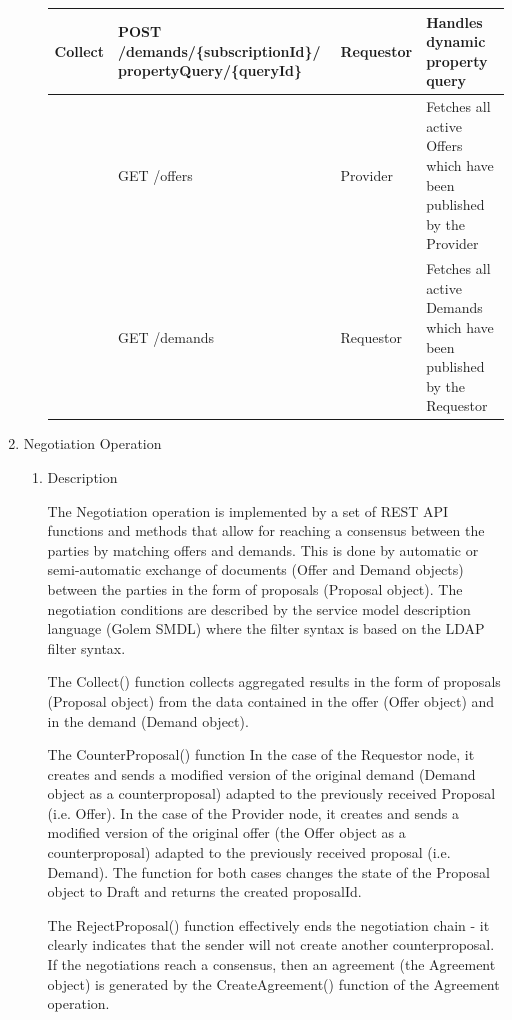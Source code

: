 \begin{enumerate}
\begin{enumerate}
\begin{table}[H]
\begin{center}
\begin{tabular}{|p{3cm}|p{7cm}|p{1.5cm}|p{4cm}|}
Collect				& 	POST /demands/\{subscriptionId\}/ \newline propertyQuery/\{queryId\} & Requestor & Handles dynamic property query \\
\hline 

					&	GET /offers								&	Provider	&	Fetches all active Offers which have been published by the Provider \\
\hline

					&	GET /demands							& 	Requestor	&	Fetches all active Demands which have been published by the Requestor \\
\hline	 

\end{tabular}
\end{center}
\end{table}

\end{enumerate}

\item  Negotiation Operation

\begin{enumerate}

\item Description

The Negotiation operation is implemented by a set of REST API functions and methods that allow for reaching a consensus between the parties
by matching offers and demands. This is done by automatic or semi-automatic exchange of documents (Offer and Demand objects)
between the parties in the form of proposals (Proposal object). 
The negotiation conditions are described by the service model description language (Golem SMDL) 
where the filter syntax is based on the LDAP filter syntax.

The Collect() function collects aggregated results in the form of proposals (Proposal object) from the data contained 
in the offer (Offer object) and in the demand (Demand object).

The CounterProposal() function In the case of the Requestor node, it creates and sends a modified version of the original demand 
(Demand object as a counterproposal) adapted to the previously received Proposal (i.e. Offer).
In the case of the Provider node, it creates and sends a modified version of the original offer (the Offer object as a counterproposal) 
adapted to the previously received proposal (i.e. Demand). The function for both cases changes the state of the Proposal object to Draft 
and returns the created proposalId. 

The RejectProposal() function effectively ends the negotiation chain - it clearly indicates
that the sender will not create another counterproposal. If the negotiations reach a consensus, 
then an agreement (the Agreement object) is generated by the CreateAgreement() function of the Agreement operation. 


\end{enumerate}
\end{enumerate}
